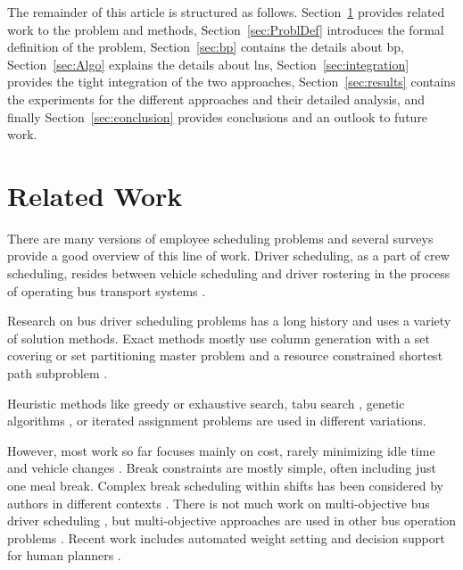 \documentclass[]{amsart}
\theoremstyle{plain}
\begin{document}
The remainder of this article is structured as follows. Section~\ref{sec:rw} provides related work to the problem and methods, Section~\ref{sec:ProblDef} introduces the formal definition of the problem, Section~\ref{sec:bp} contains the details about \acrlong{bp}, Section~\ref{sec:Algo} explains the details about \acrlong{lns}, Section~\ref{sec:integration} provides the tight integration of the two approaches, Section~\ref{sec:results} contains the experiments for the different approaches and their detailed analysis, and finally Section~\ref{sec:conclusion} provides conclusions and an outlook to future work.

\section{Related Work}
\label{sec:rw}

There are many versions of employee scheduling problems and several surveys \cite{ernststaff2004,vandenberghpersonnel2013} provide a good overview of this line of work. Driver scheduling, as a part of crew scheduling, resides between vehicle scheduling and driver rostering in the process of operating bus transport systems \cite{ibarra-rojasplanning2015}.

Research on bus driver scheduling problems has a long history \cite{fandelbus1995} and uses a variety of solution methods. Exact methods mostly use column generation with a set covering or set partitioning master problem and a resource constrained shortest path subproblem  \cite{smith1988bus,desrocherscolumn1989,portugaldriver2009,lincolumn2016}. 

Heuristic methods like greedy \cite{martelloheuristic1986,deleonebus2011,tothefficient2013} or exhaustive \cite{chencrew2013} search, tabu search \cite{lourencomultiobjective2001,fandeltabu2001}, genetic algorithms \cite{lourencomultiobjective2001,lifuzzy2003}, or iterated assignment problems \cite{constantino2017solving} are used in different variations.

However, most work so far focuses mainly on cost, rarely minimizing idle time and vehicle changes \cite{ibarra-rojasplanning2015,constantino2017solving}. Break constraints are mostly simple, often including just one meal break. Complex break scheduling within shifts has been considered by authors in different contexts \cite{beerscheduling2008,beerai-based2010,widlbreak2014}. There is not much work on multi-objective bus driver scheduling \cite{lourencomultiobjective2001}, but multi-objective approaches are used in other bus operation problems \cite{respicio2013enhanced}. Recent work includes automated weight setting \cite{kletzander2023dynamic} and decision support for human planners \cite{frohner2024decision}.
\end{document}

